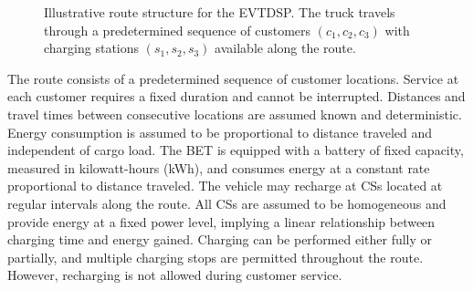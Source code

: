 \documentclass[3p,11pt,authoryear]{elsarticle}  %
\begin{document}
\begin{figure}[htbp]
\caption{Illustrative route structure for the EVTDSP. The truck travels through a predetermined sequence of customers $(c_1,c_2,c_3)$ with charging stations $(s_1,s_2,s_3)$ available along the route.}
\label{fig:evtdsp_route}
\end{figure}


The route consists of a predetermined sequence of customer locations. Service at each customer requires a fixed duration and cannot be interrupted. Distances and travel times between consecutive locations are assumed known and deterministic. Energy consumption is assumed to be proportional to distance traveled and independent of cargo load. The BET is equipped with a battery of fixed capacity, measured in kilowatt-hours (kWh), and consumes energy at a constant rate proportional to distance traveled. The vehicle may recharge at CSs located at regular intervals along the route. All CSs are assumed to be homogeneous and provide energy at a fixed power level, implying a linear relationship between charging time and energy gained. Charging can be performed either fully or partially, and multiple charging stops are permitted throughout the route. However, recharging is not allowed during customer service.
\end{document}
